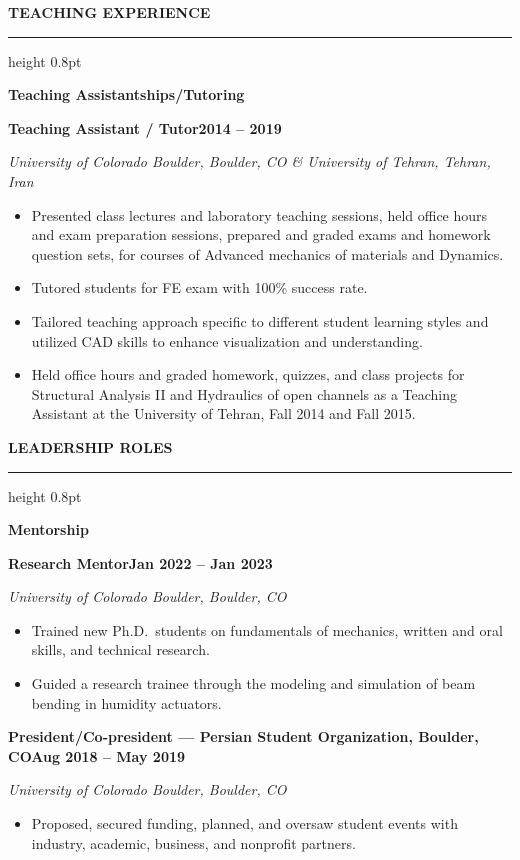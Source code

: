 \documentclass[10pt, letterpaper]{article}
\newcommand{\rsection}[1]{%
  \vspace{8pt}%
  {\large\bfseries\MakeUppercase{#1}}%
  \vspace{1pt}%
  \hrule height 0.8pt%
  \vspace{4pt}%
}
\newcommand{\jobline}[2]{%
  \vspace{5pt}%
  \noindent\textbf{#1}\hfill\textbf{#2}\par%
  \vspace{1pt}%
}
\newcommand{\subline}[1]{%
  \vspace{-1pt}%
  \noindent\textit{#1}\par%
  \vspace{1pt}%
}
\newenvironment{rlist}{%
  \begin{itemize}[leftmargin=1.4em, itemsep=1pt, topsep=2pt, parsep=0pt]%
}{%
  \end{itemize}%
}
\begin{document}
\rsection{Teaching Experience}

\noindent\textbf{Teaching Assistantships/Tutoring}

\jobline{Teaching Assistant / Tutor}{2014 -- 2019}
\subline{University of Colorado Boulder, Boulder, CO \& University of Tehran, Tehran, Iran}
\begin{rlist}
  \item Presented class lectures and laboratory teaching sessions, held office hours and exam preparation sessions, prepared and graded exams and homework question sets, for courses of Advanced mechanics of materials and Dynamics.
  \item Tutored students for FE exam with 100\% success rate.
  \item Tailored teaching approach specific to different student learning styles and utilized CAD skills to enhance visualization and understanding.
  \item Held office hours and graded homework, quizzes, and class projects for Structural Analysis II and Hydraulics of open channels as a Teaching Assistant at the University of Tehran, Fall 2014 and Fall 2015.
\end{rlist}

\rsection{Leadership Roles}

\noindent\textbf{Mentorship}

\jobline{Research Mentor}{Jan 2022 -- Jan 2023}
\subline{University of Colorado Boulder, Boulder, CO}
\begin{rlist}
  \item Trained new Ph.D.\ students on fundamentals of mechanics, written and oral skills, and technical research.
  \item Guided a research trainee through the modeling and simulation of beam bending in humidity actuators.
\end{rlist}

\jobline{President/Co-president --- Persian Student Organization, Boulder, CO}{Aug 2018 -- May 2019}
\subline{University of Colorado Boulder, Boulder, CO}
\begin{rlist}
  \item Proposed, secured funding, planned, and oversaw student events with industry, academic, business, and nonprofit partners.
\end{rlist}
\end{document}
